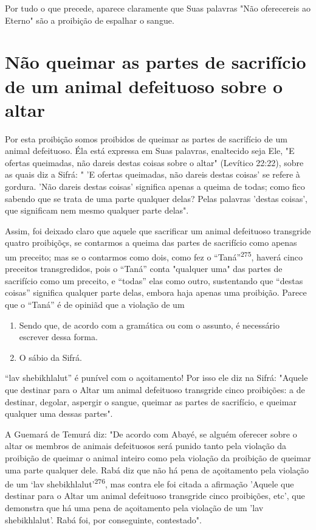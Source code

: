 Por tudo o que precede, aparece claramente que Suas palavras "Não
oferecereis ao Eterno" são a proibição de espalhar o sangue.

\section{Não queimar as partes de sacrifício de um animal defeituoso sobre o altar}

Por esta proibição somos proibidos de queimar as partes de sacrifí­cio
de um animal defeituoso. Éla está expressa em Suas palavras, enaltecido
se­ja Ele, "E ofertas queimadas, não dareis destas coisas sobre o altar"
(Levítico 22:22), sobre as quais diz a Sifrá: " 'E ofertas queimadas,
não dareis destas coi­sas' se refere à gordura. 'Não dareis destas
coisas' significa apenas a queima de todas; como fico sabendo que se
trata de uma parte qualquer delas? Pelas pala­vras 'destas coisas', que
significam nem mesmo qualquer parte delas".

Assim, foi deixado claro que aquele que sacrificar um animal defei­tuoso
transgride quatro proibiçõçs, se contarmos a queima das partes de
sacri­fício como apenas um preceito; mas se o contarmos como dois, como
fez o ``Taná''\textsuperscript{275}, haverá cinco preceitos transgredidos,
pois o ``Taná'' conta "qual­quer uma" das partes de sacrifício como um
preceito, e ``todas'' elas como ou­tro, sustentando que ``destas coisas''
significa qualquer parte delas, embora ha­ja apenas uma proibição.
Parece que o ``Taná'' é de opiniãd que a violação de um


\begin{enumerate}
\def\labelenumi{\arabic{enumi}.}
\setcounter{enumi}{273}
\item
 
 Sendo que, de acordo com a gramática ou com o assunto, é necessário
 escrever dessa forma.
 
\item
 
 O sábio da Sifrá.
 
\end{enumerate}



``lav shebikhlalut'' é punível com o açoitamento! Por isso ele diz na
Sifrá: "Aquele que destinar para o Altar um animal defeituoso transgride
cinco proibições: a de destinar, degolar, aspergir o sangue, queimar as
partes de sacrifício, e quei­mar qualquer uma dessas partes".

A Guemará de Temurá diz: "De acordo com Abayé, se alguém ofe­recer sobre
o altar os membros de animais defeituosos será punido tanto pela
violação da proibição de queimar o animal inteiro como pela violação da
proi­bição de queimar uma parte qualquer dele. Rabá diz que não há pena
de açoita­mento pela violação de um `lav
shebikhlalut'\textsuperscript{276}, mas contra ele foi citada a
afir­mação 'Aquele que destinar para o Altar um animal defeituoso
transgride cinco proibições, etc', que demonstra que há uma pena de
açoitamento pela violação de um 'lav shebikhlalut'. Rabá foi, por
conseguinte, contestado".


